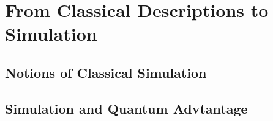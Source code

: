 \section{From Classical Descriptions to Simulation}
\subsection{Notions of Classical Simulation}

\subsection{Simulation and Quantum Advtantage}



